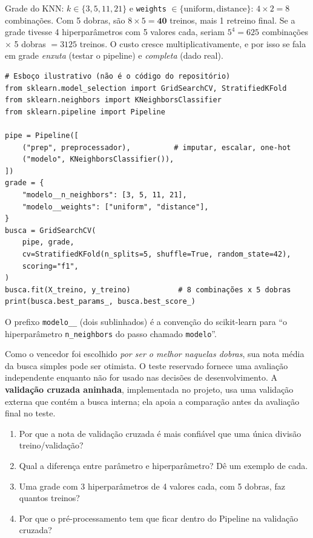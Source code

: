 \documentclass[11pt,a4paper]{article}
\newcommand{\cod}[1]{\texttt{#1}}
\begin{document}
\begin{exemplo}
Grade do KNN: $k \in \{3,5,11,21\}$ e \cod{weights} $\in \{\text{uniform},\text{distance}\}$: $4\times 2 = 8$ combinações.
Com 5 dobras, são $8\times 5 = \mathbf{40}$ treinos, mais 1 retreino final.
Se a grade tivesse 4 hiperparâmetros com 5 valores cada, seriam $5^4 = 625$ combinações $\times$ 5 dobras $= 3125$ treinos.
O custo cresce multiplicativamente, e por isso se fala em grade \emph{enxuta} (testar o pipeline) e \emph{completa} (dado real).
\end{exemplo}

\begin{lstlisting}
# Esboço ilustrativo (não é o código do repositório)
from sklearn.model_selection import GridSearchCV, StratifiedKFold
from sklearn.neighbors import KNeighborsClassifier
from sklearn.pipeline import Pipeline

pipe = Pipeline([
    ("prep", preprocessador),          # imputar, escalar, one-hot
    ("modelo", KNeighborsClassifier()),
])
grade = {
    "modelo__n_neighbors": [3, 5, 11, 21],
    "modelo__weights": ["uniform", "distance"],
}
busca = GridSearchCV(
    pipe, grade,
    cv=StratifiedKFold(n_splits=5, shuffle=True, random_state=42),
    scoring="f1",
)
busca.fit(X_treino, y_treino)           # 8 combinações x 5 dobras
print(busca.best_params_, busca.best_score_)
\end{lstlisting}

O prefixo \cod{modelo\_\_} (dois sublinhados) é a convenção do scikit-learn para ``o hiperparâmetro \cod{n\_neighbors} do passo chamado \cod{modelo}''.

\begin{atencao}
Como o vencedor foi escolhido \emph{por ser o melhor naquelas dobras}, sua nota média da busca simples pode ser otimista. O teste reservado fornece uma avaliação independente enquanto não for usado nas decisões de desenvolvimento.
A \textbf{validação cruzada aninhada}, implementada no projeto, usa uma validação externa que contém a busca interna; ela apoia a comparação antes da avaliação final no teste.
\end{atencao}

\begin{teste}
\begin{enumerate}
  \item Por que a nota de validação cruzada é mais confiável que uma única divisão treino/validação?
  \item Qual a diferença entre parâmetro e hiperparâmetro? Dê um exemplo de cada.
  \item Uma grade com 3 hiperparâmetros de 4 valores cada, com 5 dobras, faz quantos treinos?
  \item Por que o pré-processamento tem que ficar dentro do Pipeline na validação cruzada?
\end{enumerate}
\end{teste}
\end{document}
